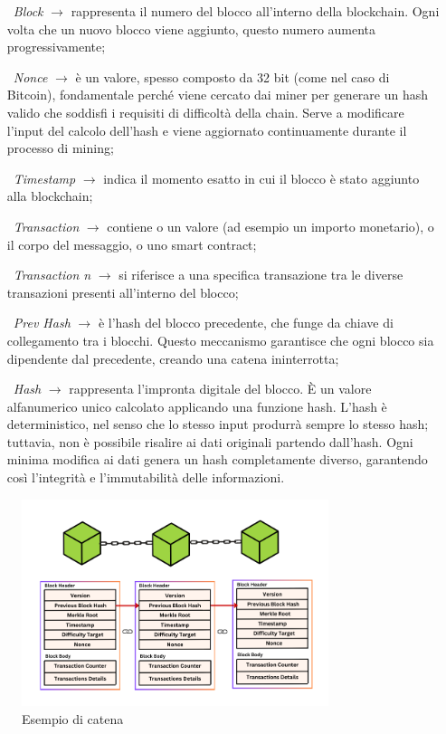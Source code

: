 \begin{adjustwidth}{1cm}{0pt}
    \begin{itemize}[itemsep=1ex]
        \item[\textbullet\ \textit{Block} $\rightarrow$ ]  rappresenta il numero del blocco all'interno della blockchain. Ogni volta che un nuovo blocco viene aggiunto, questo numero aumenta progressivamente;
        \item[\textbullet\ \textit{Nonce} $\rightarrow$ ]  è un valore, spesso composto da 32 bit (come nel caso di Bitcoin), fondamentale perché viene cercato dai miner per generare un hash valido che soddisfi i requisiti di difficoltà della chain. Serve a modificare l’input del calcolo dell’hash e viene aggiornato continuamente durante il processo di mining;
        \item [\textbullet\ \textit{Timestamp} $\rightarrow$ ] indica il momento esatto in cui il blocco è stato aggiunto alla blockchain;
        \item [\textbullet\ \textit{Transaction} $\rightarrow$ ] contiene o un valore (ad esempio un importo monetario), o il corpo del messaggio, o uno smart contract;
        \item [\textbullet\ \textit{Transaction n} $\rightarrow$ ] si riferisce a una specifica transazione tra le diverse transazioni presenti all’interno del blocco;
        \item [\textbullet\ \textit{Prev Hash} $\rightarrow$ ] è l’hash del blocco precedente, che funge da chiave di collegamento tra i blocchi. Questo meccanismo garantisce che ogni blocco sia dipendente dal precedente, creando una catena ininterrotta;
        \item [\textbullet\ \textit{Hash} $\rightarrow$ ] rappresenta l’impronta digitale del blocco. È un valore alfanumerico unico calcolato applicando una funzione hash. L’hash è deterministico, nel senso che lo stesso input produrrà sempre lo stesso hash; tuttavia, non è possibile risalire ai dati originali partendo dall’hash. Ogni minima modifica ai dati genera un hash completamente diverso, garantendo così l’integrità e l’immutabilità delle informazioni.
    \end{itemize}
\end{adjustwidth}
\vspace{1em}
\begin{figure}[t]
    \centering
    \includegraphics[width=0.8\textwidth]{Immagini/structure of block.png}
    \caption{Esempio di catena}
\end{figure}
